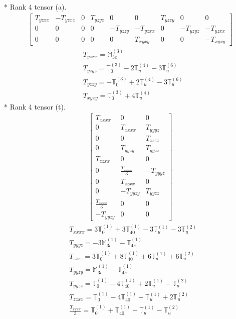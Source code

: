 \documentclass[fleqn,8pt,landscape]{jsarticle}
\begin{document}
* Rank 4 tensor (a).
\begin{align*}
\begin{bmatrix} T_{yzxx} & - T_{yzxx} & 0 & T_{yzyz} & 0 & 0 & T_{yzzy} & 0 & 0 \\ 0 & 0 & 0 & 0 & - T_{yzzy} & - T_{yzxx} & 0 & - T_{yzyz} & - T_{yzxx} \\ 0 & 0 & 0 & 0 & 0 & T_{xyxy} & 0 & 0 & - T_{xyxy} \end{bmatrix}
\end{align*}
\begin{align*}
& T_{yzxx} = \mathbb{M}_{3c}^{(3)} \\
& T_{yzyz} = \mathbb{T}_{0}^{(3)} - 2 \mathbb{T}_{u}^{(4)} - 3 \mathbb{T}_{u}^{(6)} \\
& T_{yzzy} = - \mathbb{T}_{0}^{(3)} + 2 \mathbb{T}_{u}^{(4)} - 3 \mathbb{T}_{u}^{(6)} \\
& T_{xyxy} = \mathbb{T}_{0}^{(3)} + 4 \mathbb{T}_{u}^{(4)}
\end{align*}
* Rank 4 tensor (t).
\begin{align*}
\begin{bmatrix} T_{xxxx} & 0 & 0 \\ 0 & T_{xxxx} & T_{yyyz} \\ 0 & 0 & T_{zzzz} \\ 0 & T_{yyzy} & T_{yyzz} \\ T_{zzxx} & 0 & 0 \\ 0 & \frac{T_{xxxx}}{3} & - T_{yyyz} \\ 0 & T_{zzxx} & 0 \\ 0 & - T_{yyzy} & T_{yyzz} \\ \frac{T_{xxxx}}{3} & 0 & 0 \\ - T_{yyzy} & 0 & 0 \end{bmatrix}
\end{align*}
\begin{align*}
& T_{xxxx} = 3 \mathbb{T}_{0}^{(1)} + 3 \mathbb{T}_{40}^{(1)} - 3 \mathbb{T}_{u}^{(1)} - 3 \mathbb{T}_{u}^{(2)} \\
& T_{yyyz} = - 3 \mathbb{M}_{3c}^{(1)} - \mathbb{T}_{4s}^{(1)} \\
& T_{zzzz} = 3 \mathbb{T}_{0}^{(1)} + 8 \mathbb{T}_{40}^{(1)} + 6 \mathbb{T}_{u}^{(1)} + 6 \mathbb{T}_{u}^{(2)} \\
& T_{yyzy} = \mathbb{M}_{3c}^{(1)} - \mathbb{T}_{4s}^{(1)} \\
& T_{yyzz} = \mathbb{T}_{0}^{(1)} - 4 \mathbb{T}_{40}^{(1)} + 2 \mathbb{T}_{u}^{(1)} - \mathbb{T}_{u}^{(2)} \\
& T_{zzxx} = \mathbb{T}_{0}^{(1)} - 4 \mathbb{T}_{40}^{(1)} - \mathbb{T}_{u}^{(1)} + 2 \mathbb{T}_{u}^{(2)} \\
& \frac{T_{xxxx}}{3} = \mathbb{T}_{0}^{(1)} + \mathbb{T}_{40}^{(1)} - \mathbb{T}_{u}^{(1)} - \mathbb{T}_{u}^{(2)}
\end{align*}
\end{document}
